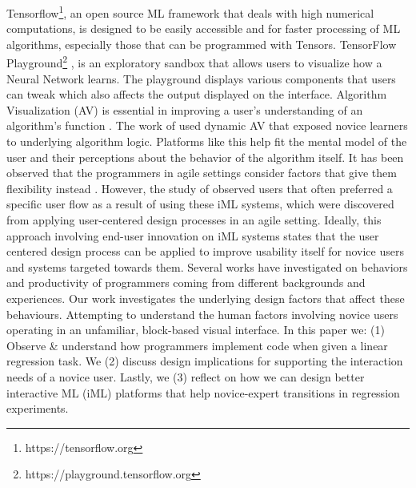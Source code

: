 \documentclass{sigchi-ext}
\begin{document}
Tensorflow\footnote{https://tensorflow.org}, an open source ML framework that deals with high numerical computations, is designed to be easily accessible and for faster processing of ML algorithms, especially those that can be programmed with Tensors. TensorFlow Playground\footnote{https://playground.tensorflow.org} , is an exploratory sandbox that allows users to visualize how a Neural Network learns. The playground displays various components that users can tweak which also affects the output displayed on the interface. Algorithm Visualization (AV) is essential in improving a user's understanding of an algorithm's function \cite{shaffer2010algorithm}. The work of \cite{vrachnos2008dave} used dynamic AV that exposed novice learners to underlying algorithm logic. Platforms like this help fit the mental model of the user and their perceptions about the behavior of the algorithm itself. It has been observed that the programmers in agile settings consider factors that give them flexibility instead \cite{hussain2009current}. However, the study of \cite{sarkar2015interactive} observed users that often preferred a specific user flow as a result of using these iML systems, which were discovered from applying user-centered design processes in an agile setting. Ideally, this approach involving end-user innovation on iML systems states that the user centered design process can be applied to improve usability itself for novice users \cite{bernardo2016interactive} and systems targeted towards them. Several works have investigated on behaviors and productivity of programmers coming from different backgrounds and experiences. Our work investigates the underlying design factors that affect these behaviours. Attempting to understand the human factors involving novice users operating in an unfamiliar, block-based visual interface. In this paper we: (1) Observe \& understand how programmers implement code when given a linear regression task. We (2) discuss design implications for supporting the interaction needs of a novice user. Lastly, we (3) reflect on how we can design better interactive ML (iML) platforms that help novice-expert transitions in regression experiments.





\end{document}

